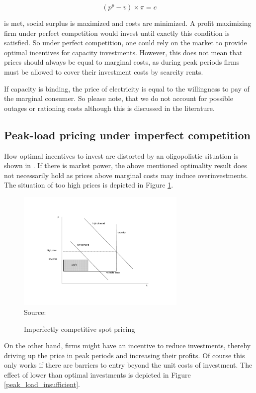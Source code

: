$$(p^p-v)\times\pi=c$$

is met, social surplus is maximized and costs are minimized. A profit maximizing firm under perfect competition would invest until exactly this condition is satisfied. So under perfect competition, one could rely on the market to provide optimal incentives for capacity investments. However, this does not mean that prices should always be equal to marginal costs, as during peak periods firms must be allowed to cover their investment costs by scarcity rents.

If capacity is binding, the price of electricity is equal to the willingness to pay of the marginal consumer. So please note, that we do not account for possible outages or rationing costs although this is discussed in the literature.

\subsection{Peak-load pricing under imperfect competition}

How optimal incentives to invest are distorted by an oligopolistic situation is shown in \cite{Fehr1995}. If there is market power, the above mentioned optimality result does not necessarily hold as prices above marginal costs may induce overinvestments. The situation of too high prices is depicted in Figure \ref{peak_load_toohigh}.

\begin{figure}[h]
\centering
\caption{Imperfectly competitive spot pricing}
\includegraphics[width=3.2in]{capacity/imperfect_spot_pricing}
      \label{peak_load_toohigh}  
\\          
\scriptsize Source: \cite{Fehr1995}
\end{figure}

On the other hand, firms might have an incentive to reduce investments, thereby driving up the price in peak periods and increasing their profits. Of course this only works if there are barriers to entry beyond the unit costs of investment. The effect of lower than optimal investments is depicted in Figure \ref{peak_load_insufficient}.

